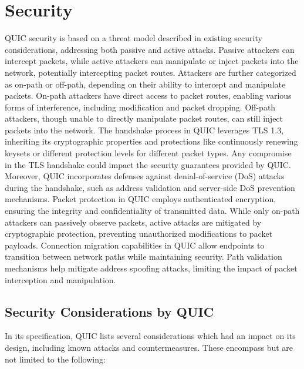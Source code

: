 \section{Security} \label{security}

QUIC security is based on a threat model described in existing security considerations, addressing both passive and
active attacks. Passive attackers can intercept packets, while active attackers can manipulate or inject packets into the network,
potentially intercepting packet routes.
Attackers are further categorized as on-path or off-path, depending on their ability to intercept and manipulate packets. On-path
attackers have direct access to packet routes, enabling various forms of interference, including modification and packet dropping.
Off-path attackers, though unable to directly manipulate packet routes, can still inject packets into the network.
The handshake process in QUIC leverages TLS 1.3, inheriting its cryptographic properties and protections like continuously renewing
keysets or different protection levels for different packet types. Any compromise in the TLS handshake could impact the security
guarantees provided by QUIC. Moreover, QUIC incorporates defenses against denial-of-service (DoS) attacks during the handshake,
such as address validation and server-side DoS prevention mechanisms.
Packet protection in QUIC employs authenticated encryption, ensuring the integrity and confidentiality of transmitted data.
While only on-path attackers can passively observe packets, active attacks are mitigated by cryptographic protection,
preventing unauthorized modifications to packet payloads.
Connection migration capabilities in QUIC allow endpoints to transition between network paths while maintaining security. Path
validation mechanisms help mitigate address spoofing attacks, limiting the impact of packet interception and manipulation.

\subsection{Security Considerations by QUIC}

In its specification, QUIC lists several considerations which had an impact on its design, including known attacks and countermeasures\cite{rfc9000}. These encompass but are not limited to the following:

